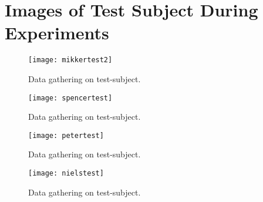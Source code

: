 \section{Images of Test Subject During Experiments}
\label{sec:Images of Test Subject During Experiments}

\begin{figure}[h!]
\centering
\texttt{[image: mikkertest2]}
\caption{Data gathering on test-subject.}
\label{fig:mikkertest2}
\end{figure}

\begin{figure}[h!]
\centering
\texttt{[image: spencertest]}
\caption{Data gathering on test-subject.}
\label{fig:spencertest}
\end{figure}

\begin{figure}[h!]
\centering
\texttt{[image: petertest]}
\caption{Data gathering on test-subject.}
\label{fig:petertest}
\end{figure}

\begin{figure}[h!]
\centering
\texttt{[image: nielstest]}
\caption{Data gathering on test-subject.}
\label{fig:nielstest}
\end{figure}
